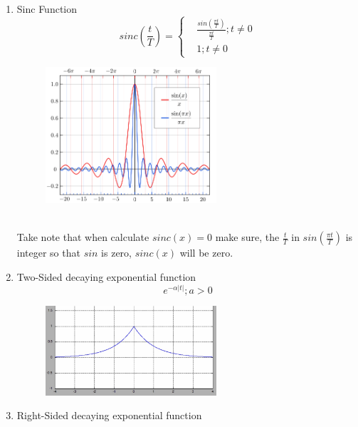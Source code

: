 \begin{enumerate}
    \newpage
    \item Sinc Function
    \begin{equation}
    sinc(\frac{t}{T}) = 
        \begin{cases}
            & \frac{sin(\frac{\pi t}{T})}{\frac{\pi t}{T}} ;  t \neq 0\\
            & 1 ; t \neq 0
        \end{cases}
    \end{equation}
    \begin{figure}[h]
        \centering
        \includegraphics[width=0.6\textwidth]{image/sinc.png}
        \label{fig:enter-label}
    \end{figure}
    \\
    Take note that when calculate $sinc(x) = 0$ make sure, the $\frac{t}{T}$ in $sin(\frac{\pi t}{T})$ is integer so that $sin$ is zero, $sinc(x)$ will be zero.
    \item Two-Sided decaying exponential function
    \begin{equation}
        e^{-\alpha |t|} ; a > 0
    \end{equation}
    \begin{figure}[h]
        \centering
        \includegraphics[width=0.6\textwidth]{image/exponential.jpg}
        \label{fig:enter-label}
    \end{figure}
    \item Right-Sided decaying exponential function
    \begin{equation}

\end{equation}
\end{enumerate}
